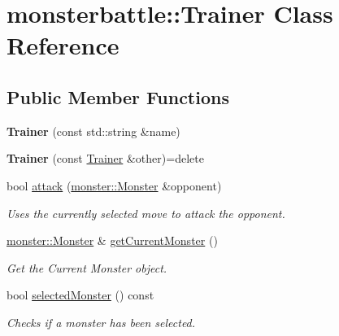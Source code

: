 \hypertarget{classmonsterbattle_1_1Trainer}{}\section{monsterbattle\+:\+:Trainer Class Reference}
\label{classmonsterbattle_1_1Trainer}
\subsection*{Public Member Functions}
\begin{DoxyCompactItemize}
\item 
\mbox{\label{classmonsterbattle_1_1Trainer_ab77deaf212f5c0013e1ac62d0ad67152}} 
{\bfseries Trainer} (const std\+::string \&name)
\item 
\mbox{\label{classmonsterbattle_1_1Trainer_a97e12aa5efa582e48f3b9fa12e249bfb}} 
{\bfseries Trainer} (const \hyperlink{classmonsterbattle_1_1Trainer}{Trainer} \&other)=delete
\item 
bool \hyperlink{classmonsterbattle_1_1Trainer_ac15af2a463e8241ac432f81b1b64e015}{attack} (\hyperlink{classmonsterbattle_1_1monster_1_1Monster}{monster\+::\+Monster} \&opponent)
\begin{DoxyCompactList}\small\item\em Uses the currently selected move to attack the opponent. \end{DoxyCompactList}\item 
\hyperlink{classmonsterbattle_1_1monster_1_1Monster}{monster\+::\+Monster} \& \hyperlink{classmonsterbattle_1_1Trainer_aac07b46ed5e8ddb91462b875e59fb2c9}{get\+Current\+Monster} ()
\begin{DoxyCompactList}\small\item\em Get the Current Monster object. \end{DoxyCompactList}\item 
bool \hyperlink{classmonsterbattle_1_1Trainer_addd687c73fd6128468483e285a601ab9}{selected\+Monster} () const
\begin{DoxyCompactList}\small\item\em Checks if a monster has been selected. \end{DoxyCompactList}\item 
\mbox{\label{classmonsterbattle_1_1Trainer_a7f480d1ecec5f1905c4234d699428eb8}} 

\end{DoxyCompactItemize}
